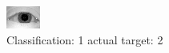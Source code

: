\begin{figure}[h!]
\begin{center}
\includegraphics[width=0.60\columnwidth]{figures/ID906_class_1_target_2.png}
\end{center}
\caption{ Classification: 1 actual target: 2}
\label{fig:ID906_class_1_target_2}
\end{figure}
